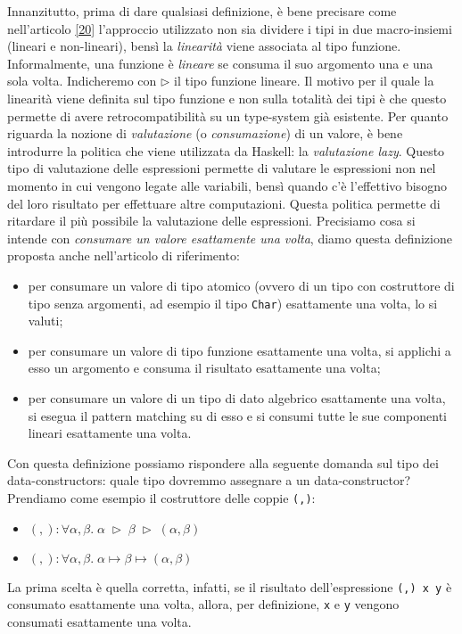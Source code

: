 \documentclass[10pt,a4paper]{article}
\begin{document}
Innanzitutto, prima di dare qualsiasi definizione, è bene precisare
come nell'articolo \hyperlink{bibl20}{[20]} l'approccio utilizzato non sia dividere i tipi in due macro-insiemi (lineari
e non-lineari), bensì la \textit{linearità} viene
associata al tipo funzione. Informalmente, una funzione è \textit{lineare} se consuma il suo argomento una e una sola
volta. Indicheremo con $ \triangleright $ il tipo funzione lineare. Il motivo per il quale la linearità viene definita
sul tipo funzione e non sulla totalità dei tipi è che questo permette di avere retrocompatibilità su un type-system già
esistente. Per quanto riguarda la nozione di \textit{valutazione} (o \textit{consumazione}) di un valore, è bene
introdurre la politica che viene utilizzata da Haskell: la \textit{valutazione lazy}. Questo tipo di valutazione delle
espressioni permette di valutare le espressioni non nel momento in cui vengono legate alle variabili,
bensì quando c'è l'effettivo bisogno del loro risultato per effettuare altre computazioni. Questa politica permette di
ritardare il più possibile la valutazione delle espressioni.
Precisiamo cosa si intende con \textit{consumare un valore esattamente una volta}, diamo questa
definizione proposta anche nell'articolo di riferimento:
\begin{itemize}
    \item per consumare un valore di tipo atomico (ovvero di un tipo con costruttore di tipo senza argomenti, ad esempio
    il tipo \texttt{Char}) esattamente una volta, lo si valuti;
    \item per consumare un valore di tipo funzione esattamente una volta, si applichi a esso un argomento e consuma
    il risultato esattamente una volta;
    \item per consumare un valore di un tipo di dato algebrico esattamente una volta, si esegua il pattern matching su
    di esso e si consumi tutte le sue componenti lineari esattamente una volta.
\end{itemize}
Con questa definizione possiamo rispondere alla seguente domanda sul tipo dei data-constructors: quale tipo
dovremmo assegnare a un data-constructor? Prendiamo come esempio il costruttore delle coppie \texttt{(,)}:
\begin{itemize}
    \item $ (,) : \forall \alpha, \beta. \; \alpha \; \triangleright \; \beta \; \triangleright \; (\alpha, \beta) $
    \item $ (,) : \forall \alpha, \beta. \; \alpha \mapsto \beta \mapsto (\alpha, \beta) $
\end{itemize}
La prima scelta è quella corretta, infatti, se il risultato dell'espressione \texttt{(,) x y} è consumato esattamente
una volta, allora, per definizione, \texttt{x} e \texttt{y} vengono consumati esattamente una volta.
\end{document}
